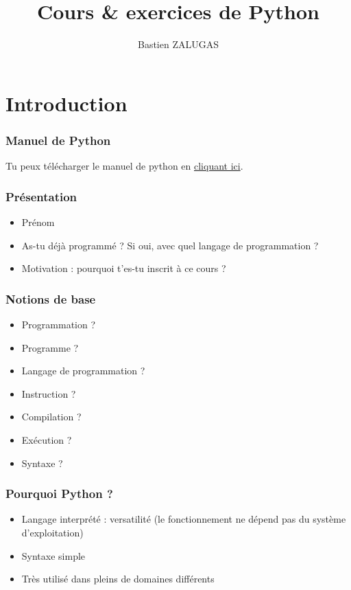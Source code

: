 \documentclass[11pt]{article}
\author{Bastien ZALUGAS}
\date{}
\title{Cours \& exercices de Python}
\begin{document}
\maketitle
\setcounter{tocdepth}{2}
\tableofcontents


\section*{Introduction}
\label{introduction}
\subsubsection*{Manuel de Python}
\label{sec:org7245587}
Tu peux télécharger le manuel de python en \href{manuel/manuel\_python.pdf}{cliquant ici}.
\subsubsection*{Présentation}
\label{sec:orgd4c025d}
\begin{itemize}
\item Prénom
\item As-tu déjà programmé ? Si oui, avec quel langage de programmation ?
\item Motivation : pourquoi t'es-tu inscrit à ce cours ?
\end{itemize}
\subsubsection*{Notions de base}
\label{sec:orgb333390}
\begin{itemize}
\item Programmation ?
\item Programme ?
\item Langage de programmation ?
\item Instruction ?
\item Compilation ?
\item Exécution ?
\item Syntaxe ?
\end{itemize}
\subsubsection*{Pourquoi Python ?}
\label{sec:org6b7f54e}
\begin{itemize}
\item Langage interprété : versatilité (le fonctionnement ne dépend pas du système d'exploitation)
\item Syntaxe simple
\item Très utilisé dans pleins de domaines différents
\end{itemize}
\end{document}
